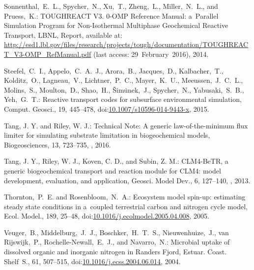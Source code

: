 \documentclass[gmd,noline]{copernicus}
\begin{document}
\begin{thebibliography}{55}
Sonnenthal,~E.~L., Spycher,~N., Xu,~T., Zheng,~L., Miller,~N.~L., and Pruess,~K.:
TOUGHREACT V3. 0-OMP Reference Manual: a~Parallel Simulation Program for Non-Isothermal Multiphase Geochemical Reactive Transport,
LBNL, Report,
available at: \url{http://esd1.lbl.gov/files/research/projects/tough/documentation/TOUGHREACT_V3-OMP_RefManual.pdf} (last access: 29~February~2016),
 2014.



Steefel,~C.~I., Appelo,~C.~A.~J., Arora,~B., Jacques,~D., Kalbacher,~T.,
Kolditz,~O., Lagneau,~V., Lichtner,~P.~C., Mayer,~K.~U., Meeussen,~J.~C.~L.,
Molins,~S., Moulton,~D., Shao,~H., \v{S}im\.{u}nek,~J., Spycher,~N.,
Yabusaki,~S.~B., Yeh,~G.~T.: Reactive transport codes for subsurface
environmental simulation, Comput. Geosci., 19, 445--478,
doi:\href{http://dx.doi.org/10.1007/s10596-014-9443-x}{10.1007/s10596-014-9443-x},
2015.



Tang, J. Y. and Riley, W. J.: Technical Note: A generic law-of-the-minimum
flux limiter for simulating substrate limitation in biogeochemical models,
Biogeosciences, 13, 723--735, ,
2016. 


\hack{\newpage}
Tang, J. Y., Riley, W. J., Koven, C. D., and Subin, Z. M.: CLM4-BeTR, a
generic biogeochemical transport and reaction module for CLM4: model
development, evaluation, and application, Geosci. Model Dev., 6, 127--140,
, 2013.



Thornton,~P.~E. and Rosenbloom,~N.~A.:
Ecosystem model spin-up: estimating steady state conditions in a~coupled terrestrial carbon and nitrogen cycle model,
Ecol. Model.,
189, 25--48,
doi:\href{http://dx.doi.org/10.1016/j.ecolmodel.2005.04.008}{10.1016/j.ecolmodel.2005.04.008}, 2005.


Veuger,~B., Middelburg,~J.~J., Boschker,~H.~T.~S., Nieuwenhuize,~J., van Rijswijk,~P., Rochelle-Newall,~E.~J., and Navarro,~N.:
Microbial uptake of dissolved organic and inorganic nitrogen in Randers Fjord,
Estuar. Coast. Shelf~S.,
61, 507--515,
doi:\href{http://dx.doi.org/10.1016/j.ecss.2004.06.014}{10.1016/j.ecss.2004.06.014}, 2004.



\end{thebibliography}
\end{document}
